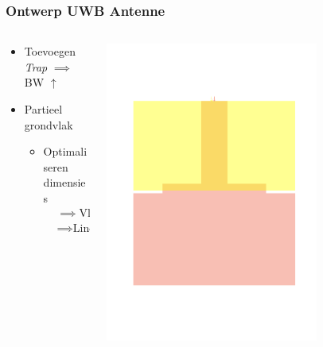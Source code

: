 \documentclass{beamer}
\begin{document}
  \begin{frame}
  \frametitle{Ontwerp UWB Antenne}
  
  \begin{columns}[c]
  \begin{column}{0.5\textwidth}
    \begin{itemize}
      \item Toevoegen \textit{Trap} $\implies$ BW $\uparrow$
      \item Partieel grondvlak
      \begin{itemize}
        \item Optimaliseren dimensies \begin{align} & \implies \text{Vlakke } S_{11} \nonumber \\ & \implies \text{Lineaire fase} \nonumber \end{align}
      \end{itemize}

    \end{itemize}
  \end{column}

  \begin{column}{0.5\textwidth}
  \centering
    \includegraphics[width=0.7\textwidth]{images/patch_stairs.pdf}
  \end{column}
  \end{columns}
  \end{frame}
\end{document}
